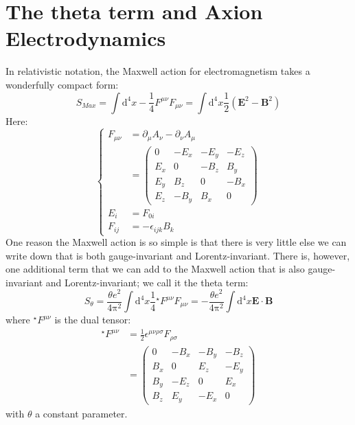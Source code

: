 \section{The theta term and Axion Electrodynamics}

In relativistic notation, the Maxwell action for electromagnetism takes a wonderfully compact form:
\begin{equation}
S_{Max} = \int \mathrm{d}^4x -\frac{1}{4} F^{\mu\nu} F_{\mu\nu} = \int \mathrm{d}^4x \frac{1}{2} (\bm{E}^2 - \bm{B}^2)
\end{equation}
Here:
\begin{equation}
\left\{
\begin{aligned}
    F_{\mu\nu} &= \partial_\mu A_\nu - \partial_\nu A_\mu \\
        & = \begin{pmatrix}
            0 & -E_x & -E_y & -E_z \\
            E_x & 0 & -B_z & B_y \\
            E_y & B_z & 0 & -B_x \\
            E_z & -B_y & B_x & 0
            \end{pmatrix}\\
    E_i &= F_{0i} \\
    F_{ij} &= -\epsilon_{ijk} B_k
\end{aligned}
\right.
\end{equation}
One reason the Maxwell action is so simple is that there is very little else we can write down that is both gauge-invariant and Lorentz-invariant. 
There is, however, one additional term that we can add to the Maxwell action that is also gauge-invariant and Lorentz-invariant; we call it the theta term:
\begin{equation}
S_\theta = \frac{\theta e^2}{4\mathrm{\pi}^2} \int \mathrm{d}^4x \frac{1}{4} {}^\star F^{\mu\nu} F_{\mu\nu} = -\frac{\theta e^2}{4\mathrm{\pi}^2} \int \mathrm{d}^4x \bm{E} \cdot \bm{B}
\end{equation}
where ${}^\star F^{\mu\nu}$ is the dual tensor:
\begin{equation}
    \begin{aligned}
    {}^\star F^{\mu\nu} &= \frac{1}{2} \epsilon^{\mu\nu\rho\sigma} F_{\rho\sigma} \\
    &= \begin{pmatrix}
        0 & -B_x & -B_y & -B_z \\
        B_x & 0 & E_z & -E_y \\
        B_y & -E_z & 0 & E_x \\
        B_z & E_y & -E_x & 0
        \end{pmatrix}
\end{aligned}
\end{equation}
with $\theta$ a constant parameter.

